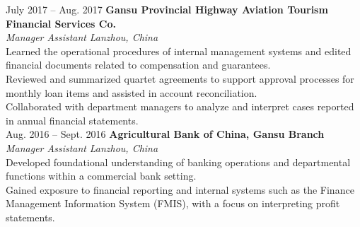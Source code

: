 \documentclass[a4paper,12pt]{article}
\begin{document}
July 2017 -- Aug. 2017 \hfill \textbf{Gansu Provincial Highway Aviation Tourism Financial Services Co.} \\
\textit{Manager Assistant} \hfill \textit{Lanzhou, China} \\
\textbullet Learned the operational procedures of internal management systems and edited financial documents related to compensation and guarantees. \\
\textbullet Reviewed and summarized quartet agreements to support approval processes for monthly loan items and assisted in account reconciliation. \\
\textbullet Collaborated with department managers to analyze and interpret cases reported in annual financial statements. \\


Aug. 2016 -- Sept. 2016 \hfill \textbf{Agricultural Bank of China, Gansu Branch} \\
\textit{Manager Assistant} \hfill \textit{Lanzhou, China} \\
\textbullet Developed foundational understanding of banking operations and departmental functions within a commercial bank setting. \\
\textbullet Gained exposure to financial reporting and internal systems such as the Finance Management Information System (FMIS), with a focus on interpreting profit statements. \\
\end{document}
